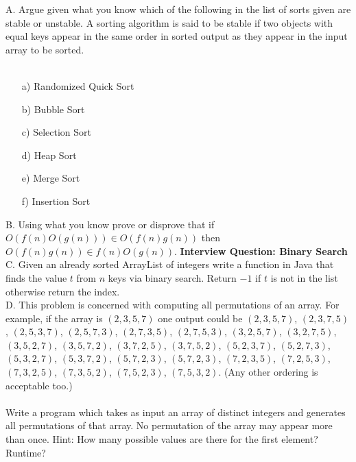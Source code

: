 \documentclass[12pt]{article}
\begin{document}
\noindent A. Argue given what you know which of the following in the list of sorts given are stable or unstable. A sorting algorithm is said to be stable if two objects with equal keys appear in the same order in sorted output as they appear in the input array to be sorted.\\\\
\begin{enumerate}
    \item[a)]Randomized Quick Sort
    \item[b)]Bubble Sort
    \item[c)]Selection Sort
    \item[d)]Heap Sort
    \item[e)]Merge Sort
    \item[f)]Insertion Sort
\end{enumerate}
\noindent B. Using what you know prove or disprove that if $O(f(n)O(g(n)))\in O(f(n)g(n))$ then $O(f(n)g(n)) \in f(n)O(g(n))$.
\newpage
\noindent\textbf{Interview Question: Binary Search}\\
\noindent C. Given an already sorted ArrayList of integers write a function in Java that finds the value $t$ from $n$ keys via binary search. Return $-1$ if $t$ is not in the list otherwise return the index.\\
\newpage
\noindent D. This problem is concerned with computing all permutations of an array. For example,
if the array is $(2,3,5, 7)$ one output could be $(2,3,5, 7)$, $(2,3,7,5)$, $(2,5,3, 7)$, $(2,5, 7,3)$,
$(2,7,3,5)$, $(2,7,5,3)$, $(3,2,5,7)$, $(3,2,7,5)$, $(3,5,2,7)$, $(3,5,7,2)$, $(3,7,2,5)$, $(3,7,5,2)$,
$(5, 2,3, 7)$, $(5,2,7,3)$, $(5,3,2,7)$, $(5,3,7,2)$, $(5,7,2,3)$, $(5,7,2,3)$, $(7,2,3,5)$, $(7,2,5,3)$,
$(7,3, 2,5)$, $(7,3,5, 2)$, $(7,5, 2,3)$, $(7,5,3, 2)$. (Any other ordering is acceptable too.)\\\\
Write a program which takes as input an array of distinct integers and generates all
permutations of that array. No permutation of the array may appear more than once.
Hint: How many possible values are there for the first element? Runtime?\\
\end{document}
